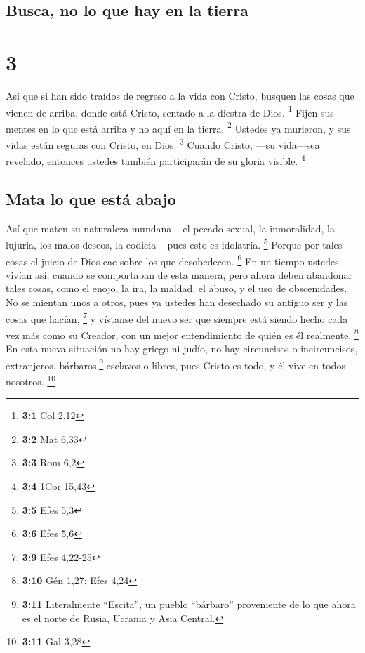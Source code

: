 \hypertarget{busca-no-lo-que-hay-en-la-tierra}{%
\subsection{Busca, no lo que hay en la
tierra}\label{busca-no-lo-que-hay-en-la-tierra}}

\hypertarget{section-2}{%
\section{3}\label{section-2}}

 Así que si han sido traídos de regreso a la vida con
Cristo, busquen las cosas que vienen de arriba, donde está Cristo,
sentado a la diestra de Dios. \footnote{\textbf{3:1} Col 2,12}
 Fijen sus mentes en lo que está arriba y no aquí en la
tierra. \footnote{\textbf{3:2} Mat 6,33}  Ustedes ya
murieron, y sus vidas están seguras con Cristo, en Dios. \footnote{\textbf{3:3}
  Rom 6,2}  Cuando Cristo, ---su vida---sea revelado,
entonces ustedes también participarán de su gloria visible. \footnote{\textbf{3:4}
  1Cor 15,43}

\hypertarget{mata-lo-que-estuxe1-abajo}{%
\subsection{Mata lo que está abajo}\label{mata-lo-que-estuxe1-abajo}}

 Así que maten su naturaleza mundana -- el pecado sexual,
la inmoralidad, la lujuria, los malos deseos, la codicia -- pues esto es
idolatría. \footnote{\textbf{3:5} Efes 5,3}  Porque por
tales cosas el juicio de Dios cae sobre los que desobedecen. \footnote{\textbf{3:6}
  Efes 5,6}  En un tiempo ustedes vivían así, cuando se
comportaban de esta manera,  pero ahora deben abandonar
tales cosas, como el enojo, la ira, la maldad, el abuso, y el uso de
obscenidades.  No se mientan unos a otros, pues ya ustedes
han desechado su antiguo ser y las cosas que hacían, \footnote{\textbf{3:9}
  Efes 4,22-25}  y vístanse del nuevo ser que siempre
está siendo hecho cada vez más como su Creador, con un mejor
entendimiento de quién es él realmente. \footnote{\textbf{3:10} Gén
  1,27; Efes 4,24}  En esta nueva situación no hay griego
ni judío, no hay circuncisos o incircuncisos, extranjeros,
bárbaros,\footnote{\textbf{3:11} Literalmente ``Escita'', un pueblo
  ``bárbaro'' proveniente de lo que ahora es el norte de Rusia, Ucrania
  y Asia Central.} esclavos o libres, pues Cristo es todo, y él vive en
todos nosotros. \footnote{\textbf{3:11} Gal 3,28}

